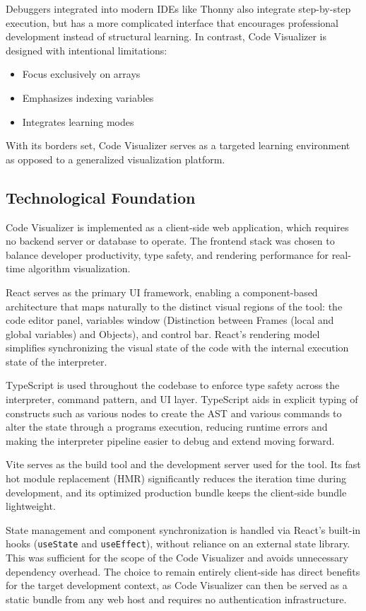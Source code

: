 \documentclass{IEEEtran}
\begin{document}
Debuggers integrated into modern IDEs like Thonny also integrate step-by-step execution, but has a more complicated interface that encourages professional development instead of structural learning. In contrast, Code Visualizer is designed with intentional limitations:
\begin{itemize}
    \item Focus exclusively on arrays
    \item Emphasizes indexing variables
    \item Integrates learning modes
\end{itemize}
With its borders set, Code Visualizer serves as a targeted learning environment as opposed to a generalized visualization platform.

\subsection{Technological Foundation}
Code Visualizer is implemented as a client-side web application, which requires no backend server or database to operate. The frontend stack was chosen to balance developer productivity, type safety, and rendering performance for real-time algorithm visualization.

React serves as the primary UI framework, enabling a component-based architecture that maps naturally to the distinct visual regions of the tool: the code editor panel, variables window (Distinction between Frames (local and global variables) and Objects), and control bar. React's rendering model simplifies synchronizing the visual state of the code with the internal execution state of the interpreter.

TypeScript is used throughout the codebase to enforce type safety across the interpreter, command pattern, and UI layer. TypeScript aids in explicit typing of constructs such as various nodes to create the AST and various commands to alter the state through a programs execution, reducing runtime errors and making the interpreter pipeline easier to debug and extend moving forward.

Vite serves as the build tool and the development server used for the tool. Its fast hot module replacement (HMR) significantly reduces the iteration time during development, and its optimized production bundle keeps the client-side bundle lightweight.

State management and component synchronization is handled via React's built-in hooks (\texttt{useState} and \texttt{useEffect}), without reliance on an external state library. This was sufficient for the scope of the Code Visualizer and avoids unnecessary dependency overhead. The choice to remain entirely client-side has direct benefits for the target development context, as Code Visualizer can then be served as a static bundle from any web host and requires no authentication infrastructure.
\end{document}
